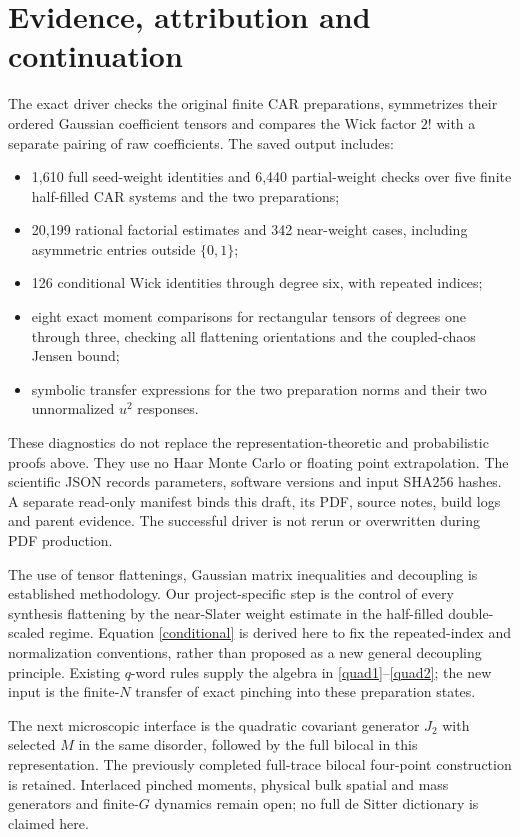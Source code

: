 \documentclass[11pt]{article}
\begin{document}
\section{Evidence, attribution and continuation}
The exact driver checks the original finite CAR preparations,
symmetrizes their ordered Gaussian coefficient tensors and compares
the Wick factor $2!$ with a separate pairing of raw coefficients.
The saved output includes:
\begin{itemize}
\item 1,610 full seed-weight identities and 6,440 partial-weight checks
over five finite half-filled CAR systems and the two preparations;
\item 20,199 rational factorial estimates and 342 near-weight cases,
including asymmetric entries outside $\{0,1\}$;
\item 126 conditional Wick identities through degree six, with
repeated indices;
\item eight exact moment comparisons for rectangular tensors of
degrees one through three, checking all flattening orientations and
the coupled-chaos Jensen bound;
\item symbolic transfer expressions for the two preparation norms
and their two unnormalized $u^2$ responses.
\end{itemize}
These diagnostics do not replace the representation-theoretic and
probabilistic proofs above. They use no Haar Monte Carlo or floating
point extrapolation. The scientific JSON records parameters, software
versions and input SHA256 hashes. A separate read-only manifest binds
this draft, its PDF, source notes, build logs and parent evidence.
The successful driver is not rerun or overwritten during PDF production.

The use of tensor flattenings, Gaussian matrix inequalities and
decoupling is established methodology. Our project-specific step is
the control of every synthesis flattening by the near-Slater weight
estimate in the half-filled double-scaled regime. Equation
\eqref{conditional} is derived here to fix the repeated-index and
normalization conventions, rather than proposed as a new general
decoupling principle. Existing $q$-word rules supply the algebra in
\eqref{quad1}--\eqref{quad2}; the new input is the finite-$N$
transfer of exact pinching into these preparation states.

The next microscopic interface is the quadratic covariant generator
$J_2$ with selected $M$ in the same disorder, followed by the full
bilocal in this representation. The previously completed full-trace
bilocal four-point construction is retained. Interlaced pinched
moments, physical bulk spatial and mass generators and finite-$G$
dynamics remain open; no full de Sitter dictionary is claimed here.
\end{document}
